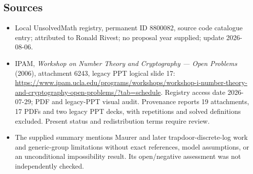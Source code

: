 \documentclass[11pt]{article}
\begin{document}
\subsection{Sources}
\begin{itemize}
\item Local UnsolvedMath registry, permanent ID 8800082, source code catalogue entry; attributed to Ronald Rivest; no proposal year supplied; update 2026-08-06.
\item IPAM, \emph{Workshop on Number Theory and Cryptography --- Open Problems} (2006), attachment 6243, legacy PPT logical slide 17: \url{https://www.ipam.ucla.edu/programs/workshops/workshop-i-number-theory-and-cryptography-open-problems/?tab=schedule}. Registry access date 2026-07-29; PDF and legacy-PPT visual audit. Provenance reports 19 attachments, 17 PDFs and two legacy PPT decks, with repetitions and solved definitions excluded. Present status and redistribution terms require review.
\item The supplied summary mentions Maurer and later trapdoor-discrete-log work and generic-group limitations without exact references, model assumptions, or an unconditional impossibility result. Its open/negative assessment was not independently checked.
\end{itemize}
\end{document}
